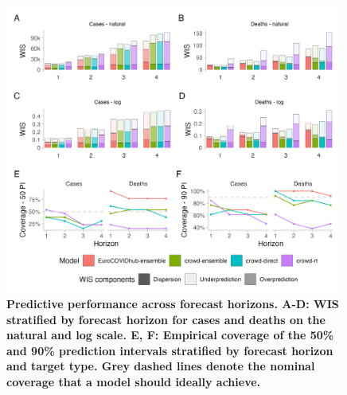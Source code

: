 \documentclass[10pt,a4paper,twocolumn]{article}
\begin{document}
% 

\begin{figure}[ht]
\includegraphics[width=0.99\textwidth]{../output/figures/performance.png}
\caption{\bf{Predictive performance across forecast horizons.} A-D: WIS stratified by forecast horizon for cases and deaths on the natural and log scale. E, F: Empirical coverage of the 50\% and 90\% prediction intervals stratified by forecast horizon and target type. Grey dashed lines denote the nominal coverage that a model should ideally achieve.}
\label{fig:performance}
\end{figure}
\end{document}
